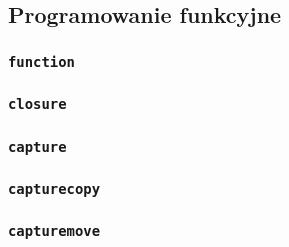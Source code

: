 \subsection{Programowanie funkcyjne}
\label{viua_vm_ops_functional}

\subsubsection{\texttt{function}}
\subsubsection{\texttt{closure}}
\subsubsection{\texttt{capture}}
\subsubsection{\texttt{capturecopy}}
\subsubsection{\texttt{capturemove}}
